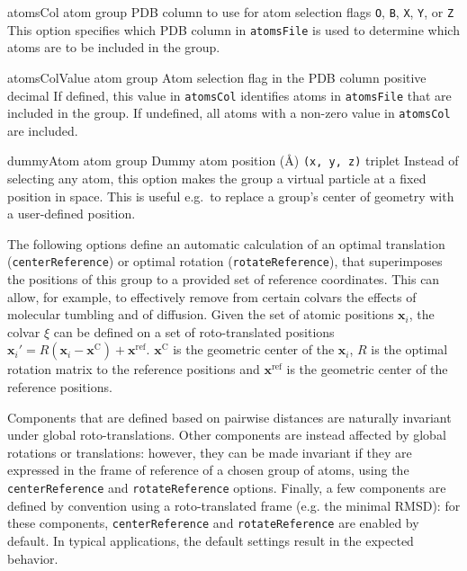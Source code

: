 \begin{itemize}
{\item %
  \key
    {atomsCol}{%
    atom group}{%
    PDB column to use for atom selection flags}{%
    \texttt{O}, \texttt{B}, \texttt{X}, \texttt{Y}, or \texttt{Z}}{%
    This option specifies which PDB column in \texttt{atomsFile} is used to determine which atoms are to be included in the group.
  }

\item %
  \key
    {atomsColValue}{%
    atom group}{%
    Atom selection flag in the PDB column}{%
    positive decimal}{%
    If defined, this value in \texttt{atomsCol} identifies atoms in \texttt{atomsFile} that are included in the group.
    If undefined, all atoms with a non-zero value in \texttt{atomsCol} are included.}
}

\item %
  \key
    {dummyAtom}{%
    atom group}{%
    Dummy atom position (\AA{})}{%
    \texttt{(x, y, z)} triplet}{%
    Instead of selecting any atom, this option makes the group a virtual particle at a fixed position in space.  This is useful e.g.~to replace a group's center of geometry with a user-defined position.}

\end{itemize}


The following options define an automatic calculation of an optimal translation (\texttt{centerReference}) or optimal rotation (\texttt{rotateReference}), that superimposes the positions of this group to a provided set of reference coordinates.
This can allow, for example, to effectively remove from certain colvars the effects of molecular tumbling and of diffusion.
Given the set of atomic positions $\mathbf{x}_{i}$, the colvar $\xi$ can be defined on a set of roto-translated positions $\mathbf{x}_{i}' = R(\mathbf{x}_{i} - \mathbf{x}^{\mathrm{C}}) + \mathbf{x}^{\mathrm{ref}}$.
$\mathbf{x}^{\mathrm{C}}$ is the geometric center of the $\mathbf{x}_{i}$, $R$ is the optimal rotation matrix to the reference positions and $\mathbf{x}^{\mathrm{ref}}$ is the geometric center of the reference positions.

Components that are defined based on pairwise distances are naturally invariant under global roto-translations.
Other components are instead affected by global rotations or translations: however, they can be made invariant if they are expressed in the frame of reference of a chosen group of atoms, using the \texttt{centerReference} and \texttt{rotateReference} options.
Finally, a few components are defined by convention using a roto-translated frame (e.g. the minimal RMSD): for these components, \texttt{centerReference} and \texttt{rotateReference} are enabled by default.
In typical applications, the default settings result in the expected behavior.

